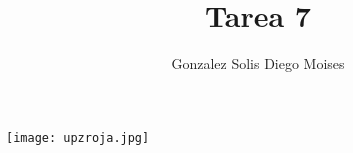 \documentclass[12pt,a4paper]{article}
\author{Gonzalez Solis Diego Moises}
\title{Tarea 7}
\begin{document}
\maketitle
\texttt{[image: upzroja.jpg]} 
\newpage

\end{document}
